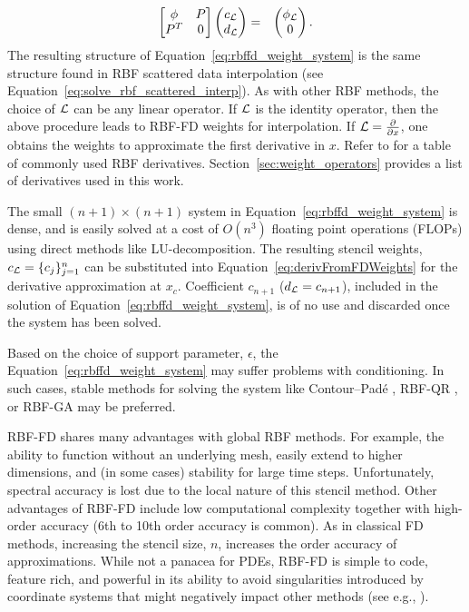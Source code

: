 \documentclass[11pt]{report}
\begin{document}
{\begin{eqnarray}
\begin{bmatrix} \phi & P \\
		P^T & 0 \end{bmatrix} \begin{pmatrix} c_{\mathcal{L}} \\ 
							d_{\mathcal{L}} \end{pmatrix} & = & \begin{pmatrix} \phi_{\mathcal{L}} \\
							0 \end{pmatrix}. \nonumber
	\end{eqnarray}	
The resulting structure of Equation~\ref{eq:rbffd_weight_system} is the same structure found in RBF scattered data interpolation (see Equation~\ref{eq:solve_rbf_scattered_interp}). 
As with other RBF methods, the choice of $\mathcal{L}$ can be any linear operator. If $\diffop$ is the identity operator, then the above procedure leads to RBF-FD weights for interpolation. If $\mathcal{L}=\frac{\partial }{\partial x}$, one obtains the weights to approximate the first derivative in $x$. Refer to \cite{Fasshauer2007} for a table of commonly used RBF derivatives. Section~\ref{sec:weight_operators} provides a list of derivatives used in this work. 

The small $(n + 1) \times (n + 1)$ system in Equation~\ref{eq:rbffd_weight_system} is dense, and is easily solved at a cost of $O(n^3)$ floating point operations (FLOPs) using direct methods like LU-decomposition. The resulting stencil weights, $c_{\mathcal{L}} = \{c_j\}_{j=1}^n$ can be substituted into Equation~\ref{eq:derivFromFDWeights} for the derivative approximation at $x_c$. Coefficient $c_{n+1}$ ($d_{\mathcal{L}} = c_{n+1}$), included in the solution of Equation~\ref{eq:rbffd_weight_system}, is of no use and discarded once the system has been solved. 

Based on the choice of support parameter, $\epsilon$, the Equation~\ref{eq:rbffd_weight_system} may suffer problems with conditioning. In such cases, stable methods for solving the system like Contour--Pad\'{e} \cite{Wright2003}, RBF-QR \cite{Fornberg2011a,Davydov2011}, or RBF-GA \cite{Fornberg2012} may be preferred.  

RBF-FD 
shares many advantages with global RBF methods. For example, the ability to function without an underlying mesh,  easily extend to higher dimensions, and (in some cases) stability for large time steps. Unfortunately, spectral accuracy is lost due to the local nature of this stencil method. 
Other advantages of RBF-FD 
include low computational complexity together with high-order accuracy
(6th to 10th order accuracy is common). 
As in classical FD methods, increasing the stencil size, $n$, increases the order accuracy of approximations. While not a panacea for PDEs, RBF-FD is simple to code, feature rich, and powerful in its ability to avoid singularities introduced by coordinate systems that might negatively impact other methods (see e.g., \cite{FlyerWright07,FornbergLehto11}). 

}
\end{document}
